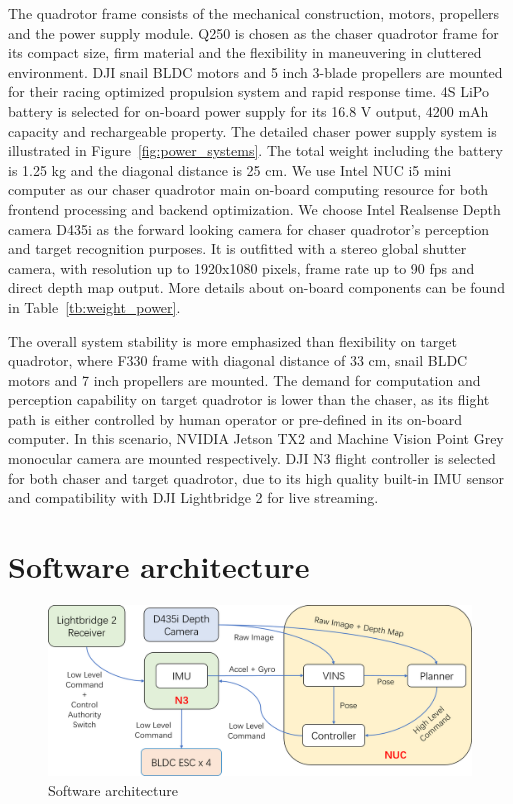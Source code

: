 The quadrotor frame consists of the mechanical construction, motors, propellers and the power supply module. Q250 is chosen as the chaser quadrotor frame for its compact size, firm material and the flexibility in maneuvering in cluttered environment. DJI snail BLDC motors and 5 inch 3-blade propellers are mounted for their racing optimized propulsion system and rapid response time. 4S LiPo battery is selected for on-board power supply for its 16.8 V output, 4200 mAh capacity and rechargeable property. The detailed chaser power supply system is illustrated in Figure~\ref{fig:power_systems}. The total weight including the battery is 1.25 kg and the diagonal distance is 25 cm. We use Intel NUC i5 mini computer as our chaser quadrotor main on-board computing resource for both frontend processing and backend optimization. We choose Intel Realsense Depth camera D435i as the forward looking camera for chaser quadrotor's perception and target recognition purposes. It is outfitted with a stereo global shutter camera, with resolution up to 1920x1080 pixels, frame rate up to 90 fps and direct depth map output. More details about on-board components can be found in Table~\ref{tb:weight_power}.

The overall system stability is more emphasized than flexibility on target quadrotor, where F330 frame with diagonal distance of 33 cm, snail BLDC motors and 7 inch propellers are mounted. The demand for computation and perception capability on target quadrotor is lower than the chaser, as its flight path is either controlled by human operator or pre-defined in its on-board computer. In this scenario, NVIDIA Jetson TX2 and Machine Vision Point Grey monocular camera are mounted respectively. DJI N3 flight controller is selected for both chaser and target quadrotor, due to its high quality built-in IMU sensor and compatibility with DJI Lightbridge 2 for live streaming.

\section{Software architecture}\label{software}

\begin{figure}[ht]
  \centering
  \includegraphics[width=1.0\textwidth]{figure/chapter_4/system_diagram.png}
  \caption{Software architecture}
  \label{fig:software_architecture}
\end{figure}

